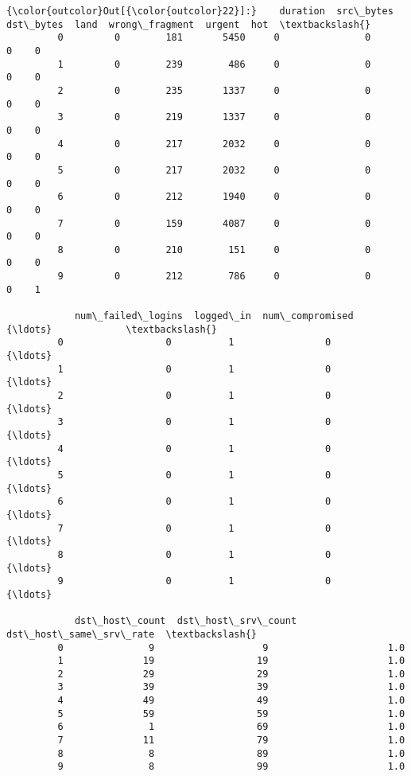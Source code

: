 \documentclass[11pt]{article}
\begin{document}
\begin{Verbatim}[commandchars=\\\{\}]
{\color{outcolor}Out[{\color{outcolor}22}]:}    duration  src\_bytes  dst\_bytes  land  wrong\_fragment  urgent  hot  \textbackslash{}
         0         0        181       5450     0               0       0    0   
         1         0        239        486     0               0       0    0   
         2         0        235       1337     0               0       0    0   
         3         0        219       1337     0               0       0    0   
         4         0        217       2032     0               0       0    0   
         5         0        217       2032     0               0       0    0   
         6         0        212       1940     0               0       0    0   
         7         0        159       4087     0               0       0    0   
         8         0        210        151     0               0       0    0   
         9         0        212        786     0               0       0    1   
         
            num\_failed\_logins  logged\_in  num\_compromised            {\ldots}             \textbackslash{}
         0                  0          1                0            {\ldots}              
         1                  0          1                0            {\ldots}              
         2                  0          1                0            {\ldots}              
         3                  0          1                0            {\ldots}              
         4                  0          1                0            {\ldots}              
         5                  0          1                0            {\ldots}              
         6                  0          1                0            {\ldots}              
         7                  0          1                0            {\ldots}              
         8                  0          1                0            {\ldots}              
         9                  0          1                0            {\ldots}              
         
            dst\_host\_count  dst\_host\_srv\_count  dst\_host\_same\_srv\_rate  \textbackslash{}
         0               9                   9                     1.0   
         1              19                  19                     1.0   
         2              29                  29                     1.0   
         3              39                  39                     1.0   
         4              49                  49                     1.0   
         5              59                  59                     1.0   
         6               1                  69                     1.0   
         7              11                  79                     1.0   
         8               8                  89                     1.0   
         9               8                  99                     1.0   
         

\end{Verbatim}
\end{document}
